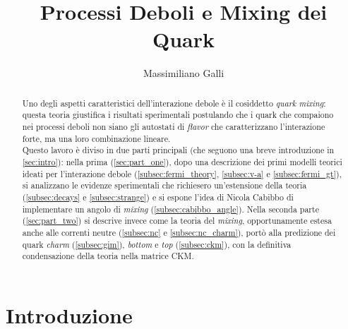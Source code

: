 \documentclass{subnucbo}
\title{Processi Deboli e Mixing dei Quark}
\author{Massimiliano Galli}
\begin{document}
\maketitle

\begin{abstract}
        Uno degli aspetti caratteristici dell'interazione debole è il cosiddetto \textit{quark mixing}: questa teoria giustifica i risultati sperimentali postulando che i quark che compaiono nei processi deboli non siano gli autostati di \textit{flavor} che caratterizzano l'interazione forte, ma una loro combinazione lineare. \\
        Questo lavoro è diviso in due parti principali (che seguono una breve introduzione in \ref{sec:intro}): nella prima (\ref{sec:part_one}), dopo una descrizione dei primi modelli teorici ideati per l'interazione debole (\ref{subsec:fermi_theory}, \ref{subsec:v-a} e \ref{subsec:fermi_gt}), si analizzano le evidenze sperimentali che richiesero un'estensione della teoria (\ref{subsec:decays} e \ref{subsec:strange}) e si espone l'idea di Nicola Cabibbo di implementare un angolo di \textit{mixing} (\ref{subsec:cabibbo_angle}).
        Nella seconda parte (\ref{sec:part_two}) si descrive invece come la teoria del \textit{mixing}, opportunamente estesa anche alle correnti neutre (\ref{subsec:nc} e \ref{subsec:nc_charm}), portò alla predizione dei quark \textit{charm} (\ref{subsec:gim}), \textit{bottom} e \textit{top} (\ref{subsec:ckm}), con la definitiva condensazione della teoria nella matrice CKM.
\end{abstract}

\section{Introduzione}
\label{sec:intro}
\end{document}
